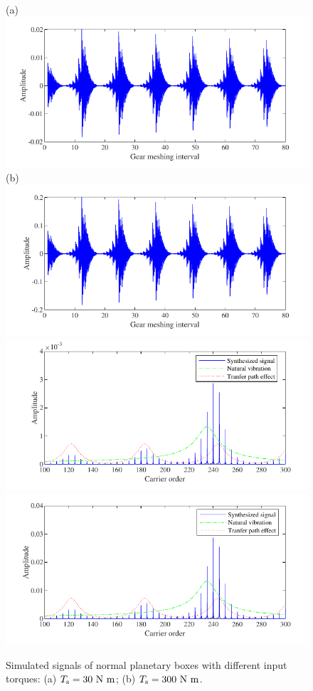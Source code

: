 \documentclass[a4paper,fleqn]{cas-sc}%
\begin{document}
\begin{figure}[pos=htbp]
    \centering
    (a) \includegraphics[scale=\myscale,valign=t]{Time_p5_normal_L30.pdf}
    (b) \includegraphics[scale=\myscale,valign=t]{Time_p5_normal_L300.pdf}\\
    \hspace*{1.5em}\includegraphics[scale=\myscale,valign=t]{Freq_p5_normal_L30.pdf}
    \hspace*{1.5em}\includegraphics[scale=\myscale,valign=t]{Freq_p5_normal_L300.pdf}
    \caption{Simulated signals of normal planetary boxes with different input torques: (a) $T_{\rm s}=30\ {\rm N\ m}$; (b) $T_{\rm s}=300\ {\rm N\ m}$.}
    \label{fig:simulated_p5_normal}
\end{figure}
\end{document}
